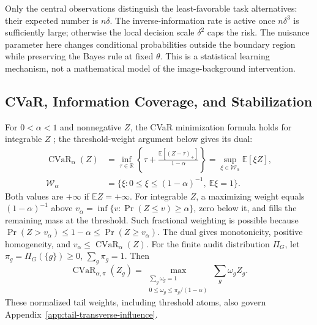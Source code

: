 Only the central observations distinguish the least-favorable task alternatives: their expected number is $n\delta$. The inverse-information rate is active once $n\delta^3$ is sufficiently large; otherwise the local decision scale $\delta^2$ caps the risk. The nuisance parameter here changes conditional probabilities outside the boundary region while preserving the Bayes rule at fixed $\theta$. This is a statistical learning mechanism, not a mathematical model of the image-background intervention.

\subsection{CVaR, Information Coverage, and Stabilization}
\label{app:theory-certificate}

For $0<\alpha<1$ and nonnegative $Z$, the CVaR minimization formula holds for integrable $Z$ \citep[Theorem~10]{rockafellar2002conditional}; the threshold-weight argument below gives its dual:
\begin{equation}
\begin{aligned}
\operatorname{CVaR}_\alpha(Z)
&=\inf_{\tau\in\mathbb R}\left\{\tau+\frac{\mathbb E[(Z-\tau)_+]}{1-\alpha}\right\}
=\sup_{\xi\in\mathcal W_\alpha}\mathbb E[\xi Z],\\
\mathcal W_\alpha&=\{\xi:0\le\xi\le(1-\alpha)^{-1},\ \mathbb E\xi=1\}.
\end{aligned}
\label{eq:app-cvar-dual}
\end{equation}
Both values are $+\infty$ if $\mathbb EZ=+\infty$. For integrable $Z$, a maximizing weight equals $(1-\alpha)^{-1}$ above $v_\alpha=\inf\{v:\Pr(Z\le v)\ge\alpha\}$, zero below it, and fills the remaining mass at the threshold. Such fractional weighting is possible because $\Pr(Z>v_\alpha)\le1-\alpha\le\Pr(Z\ge v_\alpha)$. The dual gives monotonicity, positive homogeneity, and $v_\alpha\le\operatorname{CVaR}_\alpha(Z)$. For the finite audit distribution $\Pi_G$, let $\pi_g=\Pi_G(\{g\})\ge0$, $\sum_g\pi_g=1$. Then
\begin{equation}
\operatorname{CVaR}_{\alpha,\pi}(Z_g)
=\max_{\substack{\sum_g\omega_g=1\\0\le\omega_g\le\pi_g/(1-\alpha)}}\sum_g\omega_gZ_g.
\label{eq:app-finite-cvar}
\end{equation}
These normalized tail weights, including threshold atoms, also govern Appendix~\ref{app:tail-transverse-influence}.

